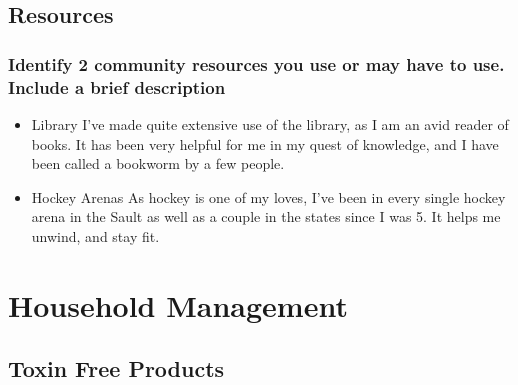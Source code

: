\documentclass[11pt]{article}
\begin{document}
\subsection*{Resources}
\label{sec:org5d877c4}
\subsubsection*{Identify 2 community resources you use or may have to use. Include a brief description}
\label{sec:org6a93956}
\begin{itemize}
\item Library
\label{sec:org9dd5ab1}
I've made quite extensive use of the library, as I am an avid reader of books. It has been very helpful for me in my quest of knowledge, and I have been called a bookworm by a few people.
\item Hockey Arenas
\label{sec:org987d920}
As hockey is one of my loves, I've been in every single hockey arena in the Sault as well as a couple in the states since I was 5. It helps me unwind, and stay fit.
\end{itemize}
\section*{Household Management}
\label{sec:org7fd8571}
\subsection*{Toxin Free Products}
\label{sec:org90a52dc}
\end{document}
